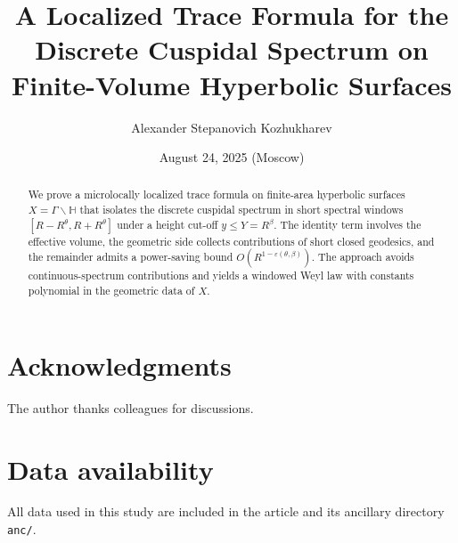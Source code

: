 \documentclass[12pt]{amsart}
\title[Localized Trace Formula]{A Localized Trace Formula for the Discrete Cuspidal Spectrum on Finite-Volume Hyperbolic Surfaces}
\author{Alexander Stepanovich Kozhukharev}
\date{August 24, 2025 (Moscow)}
\numberwithin{equation}{section}
\theoremstyle{plain}
\theoremstyle{definition}
\theoremstyle{remark}
\newcommand{\HH}{\mathbb{H}}
\begin{document}
\begin{abstract}
We prove a microlocally localized trace formula on finite-area hyperbolic surfaces $X=\Gamma\backslash\HH$ that isolates the discrete cuspidal spectrum in short spectral windows $[R-R^\theta,R+R^\theta]$ under a height cut-off $y\le Y=R^\beta$. The identity term involves the effective volume, the geometric side collects contributions of short closed geodesics, and the remainder admits a power-saving bound $O(R^{1-\varepsilon(\theta,\beta)})$. The approach avoids continuous-spectrum contributions and yields a windowed Weyl law with constants polynomial in the geometric data of $X$.
\end{abstract}

\maketitle
\tableofcontents










\section*{Acknowledgments}
The author thanks colleagues for discussions.

\section*{Data availability}
All data used in this study are included in the article and its ancillary directory \texttt{anc/}.

\appendix



\nocite{*}


\end{document}
